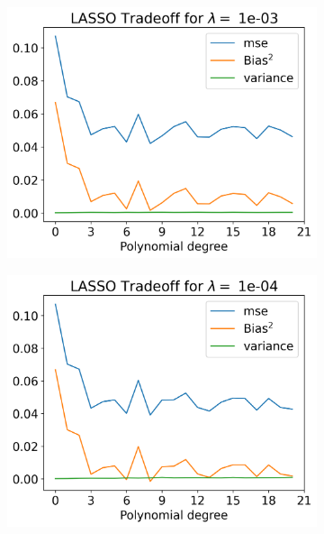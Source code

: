 \documentclass[12pt]{article}
\begin{document}
\begin{figure}[H]
\begin{subfigure}{.5\textwidth}
    \centering
    \includegraphics[width=\textwidth]{../figures/tradeoff_LASSO_1e-03_20.png}
    \caption{}
    \label{fig:l_1e-10}
  \end{subfigure}
  \begin{subfigure}{.5\textwidth}
    \centering
    \includegraphics[width=\textwidth]{../figures/tradeoff_LASSO_1e-0420.png}
    \caption{}
    \label{fig:l_1e-1}
  \end{subfigure}
  \begin{subfigure}{.5\textwidth}
    \centering

\end{subfigure}
\end{figure}
\end{document}
